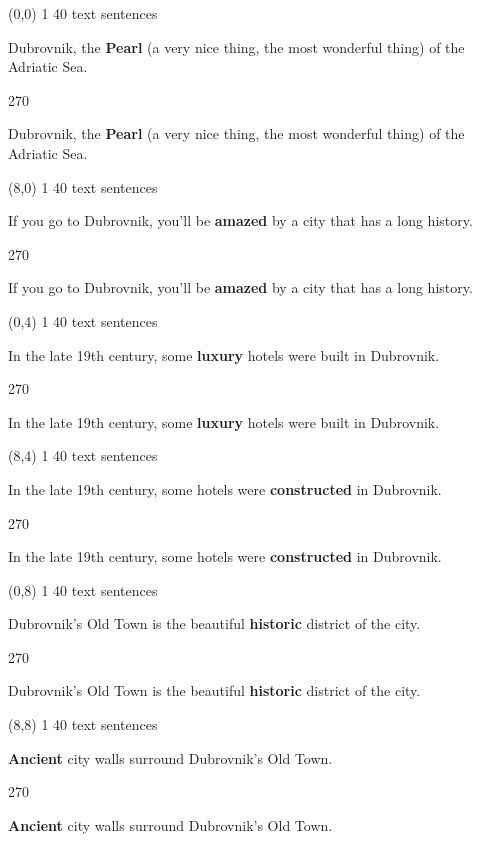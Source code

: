 \documentclass[a4paper]{article}
\newenvironment{itemize*}%
{\begin{itemize}%
 \setlength{\itemsep}{0.5cm}%
 \setlength{\parsep}{0pt}%
 \setlength{\parskip}{0pt}}%
{\end{itemize}}
\newcommand{\mycard}[3]{%
	\small #1 #2
	\par
	\parbox[t][6.8cm][c]{9.5cm}{%
	\par
	\myleft{#3}
	\par
	\myright{#3}
	}
}
\newcommand{\myleft}[1]{%
	\begin{sideways}
	\hspace*{-0.9cm}
		\parbox[t][2.7cm][t]{6.5cm}{%
		\large #1
		}
	\end{sideways}
}
\newcommand{\myright}[1]{%
	\hspace*{6.5cm}
	\begin{turn}{270}
	\hspace*{-7.1cm}
		\parbox[t][2.7cm][t]{6.5cm}{%
		\large #1
		}
	\end{turn}
}
\begin{document}
\begin{textblock}{8}(0,0)
\mycard{1}{40 text sentences}{
\begin{itemize*}
\item Dubrovnik, the \textbf{Pearl} (a very nice thing, the most wonderful thing) of the Adriatic Sea.
\end{itemize*}
}
\end{textblock}

\begin{textblock}{8}(8,0)
\mycard{1}{40 text sentences}{
\begin{itemize*}
\item If you go to Dubrovnik, you'll be \textbf{amazed} by a city that has a long history.
\end{itemize*}
}
\end{textblock}

\begin{textblock}{8}(0,4)
\mycard{1}{40 text sentences}{
\begin{itemize*}
\item In the late 19th century, some \textbf{luxury} hotels were built in Dubrovnik.
\end{itemize*}
}
\end{textblock}

\begin{textblock}{8}(8,4)
\mycard{1}{40 text sentences}{
\begin{itemize*}
\item In the late 19th century, some hotels were \textbf{constructed} in Dubrovnik.
\end{itemize*}
}
\end{textblock}

\begin{textblock}{8}(0,8)
\mycard{1}{40 text sentences}{
\begin{itemize*}
\item Dubrovnik's Old Town is the beautiful \textbf{historic} district of the city.
\end{itemize*}
}
\end{textblock}

\begin{textblock}{8}(8,8)
\mycard{1}{40 text sentences}{
\begin{itemize*}
\item \textbf{Ancient} city walls surround Dubrovnik's Old Town.
\end{itemize*}
}
\end{textblock}
\end{document}
